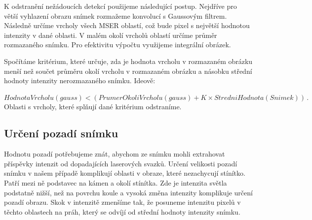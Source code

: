K odstranění nežádoucích detekcí použijeme následující postup. Nejdříve pro větší vyhlazení obrazu snímek rozmažeme konvolucí s Gaussovým filtrem. Následně určíme vrcholy všech MSER oblastí, což bude pixel s největší hodnotou intenzity v dané oblasti. V malém okolí vrcholů oblastí určíme průměr rozmazaného snímku. Pro efektivitu výpočtu využijeme integrální obrázek.

Spočítáme kritérium, které určuje, zda je hodnota vrcholu v rozmazaném obrázku menší než součet průměru okolí vrcholu v rozmazaném obrázku a násobku střední hodnoty intenzity nerozmazaného snímku. Ideově: 

$ HodnotaVrcholu(gauss) < \left( PrumerOkoliVrcholu(gauss) + K\times StredniHodnota(Snimek)\right)\,.$ Oblasti s vrcholy, které splňují dané kritérium odstraníme.

%	
%	
%	


\subsection*{Určení pozadí snímku}
	Hodnotu pozadí potřebujeme znát, abychom ze snímku mohli extrahovat příspěvky intenzit od dopadajících laserových svazků. Určení velikosti pozadí snímku v našem případě komplikují oblasti v obraze, které nezachycují stínítko. Patří mezi ně podstavec na kámen a okolí stínítka. Zde je intenzita světla podstatně nižší, než na povrchu koule a vysoká změna intenzity komplikuje určení pozadí obrazu. Skok v intenzitě zmenšíme tak, že posuneme intenzitu pixelů v těchto oblastech na práh, který se odvíjí od střední hodnoty intenzity snímku. 
	
